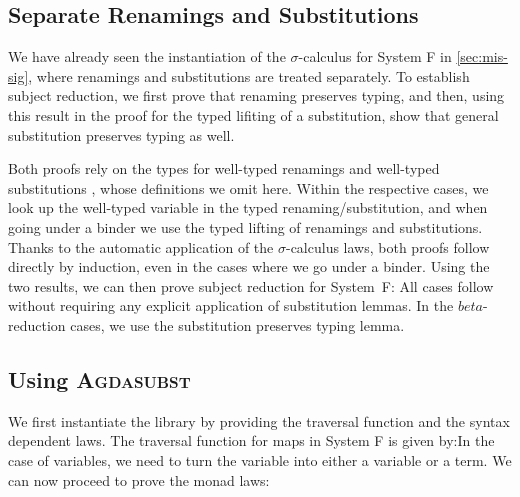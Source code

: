 \documentclass[screen,nonacm]{acmart}
\begin{document}
\subsection*{Separate Renamings and Substitutions}
We have already seen the instantiation of the $\sigma$-calculus for System F in
\cref{sec:mis-sig}, where renamings and substitutions are treated separately.
To establish subject reduction, we first prove that renaming preserves typing,
and then, using this result in the proof for the typed lifiting of a
substitution, show that general substitution preserves typing as well.

\begin{minipage}[t]{0.48\linewidth}
      \raggedright{}
      \ERPT{}
\end{minipage}
\begin{minipage}[t]{0.48\linewidth}
      \raggedright{}
      \ESPT{}
\end{minipage}

Both proofs rely on the types for well-typed renamings \EWTR{} \; and
well-typed substitutions \EWTS{}, whose definitions we omit here. Within the
respective cases, we look up the well-typed variable in the typed
renaming/substitution, and when going under a binder we use the typed lifting
of renamings and substitutions. Thanks to the automatic application of the
$\sigma$-calculus laws, both proofs follow directly by induction, even in the
cases where we go under a binder. Using the two results, we can then prove
subject reduction for System~F: \ESR{}All cases follow without requiring any
explicit application of substitution lemmas. In the $beta$-reduction cases, we
use the substitution preserves typing lemma.

\subsection*{Using \textsc{Agdasubst}}
We first instantiate the library by providing the traversal function and the syntax dependent laws.
The traversal function for maps in System F is given by:\SFTraversal{}In the case of variables, we need to turn the variable into either a variable or a term. We can now proceed to prove the monad laws:

\begin{minipage}[t]{0.48\linewidth}
      \small
      \raggedright{}
      \SFId{}
\end{minipage}
\begin{minipage}[t]{0.48\linewidth}
      \small
      \raggedright{}
      \SFCompo{}
\end{minipage}
\end{document}
